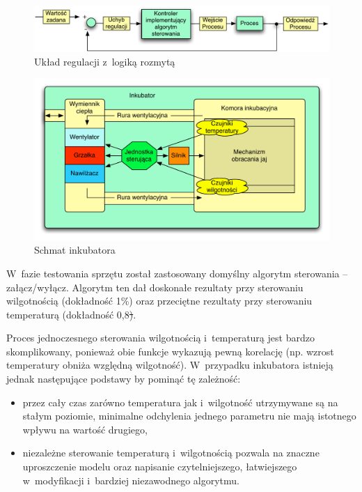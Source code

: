 \begin{figure}[t] 
	\centering\includegraphics[width=\textwidth]{figures/DiagramSterowania}
	\caption{Układ regulacji z~logiką rozmytą}\label{rys:DiagramSterowania}
\end{figure}
	
\begin{figure}[t] 
	\centering\includegraphics[width=\textwidth]{figures/SchematLogiczny}
	\caption{Schmat inkubatora}\label{rys:SchematLogiczny}
\end{figure}
	
W~fazie testowania sprzętu został zastosowany domyślny algorytm sterowania --
załącz/wyłącz. Algorytm ten dał doskonałe rezultaty przy sterowaniu wilgotnością
(dokładność 1\%) oraz przeciętne rezultaty przy sterowaniu temperaturą
(dokładność 0,8\st).

Proces jednoczesnego sterowania wilgotnością i~temperaturą jest bardzo
skomplikowany, ponieważ obie funkcje wykazują pewną korelację (np. wzrost
temperatury obniża względną wilgotność). W~przypadku inkubatora istnieją jednak
następujące podstawy by pominąć tę zależność:
\begin{itemize}
	\item przez cały czas zarówno temperatura jak i~wilgotność utrzymywane są na stałym poziomie, minimalne odchylenia jednego parametru nie mają istotnego wpływu na wartość drugiego,
	\item niezależne sterowanie temperaturą i~wilgotnością pozwala na znaczne uproszczenie modelu oraz napisanie czytelniejszego, łatwiejszego w~modyfikacji i~bardziej niezawodnego algorytmu.
\end{itemize}

